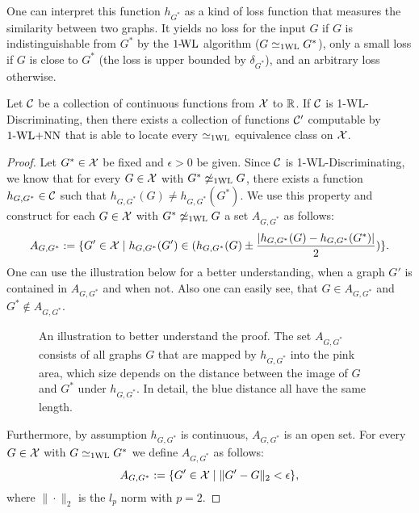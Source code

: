 One can interpret this function $h_{G^*}$ as a kind of loss function that measures the similarity between two graphs. It yields no loss for the input $G$ if $G$ is indistinguishable from $G^*$ by the $\text{1-\!WL}$ algorithm ($G \simeq_{\text{1WL}} G^*$), only a small loss if $G$ is close to $G^*$ (the loss is upper bounded by $\delta_{G^*}$), and an arbitrary loss otherwise.

\begin{lemma}\label{lem:continuous_proof1}
    Let $\mathcal{C}$ be a collection of continuous functions from $\mathcal{X}$ to $\mathbb{R}$. If $\mathcal{C}$ is 1-\!WL-Discriminating, then there exists a collection of functions $\mathcal{C}'$ computable by $\text{1-WL+NN}$ that is able to locate every $\simeq_{\text{1WL}}$ equivalence class on $\mathcal{X}$.
\end{lemma}

\begin{proof}
    Let $G^* \in \mathcal{X}$ be fixed and $\epsilon > 0$ be given. Since $\mathcal{C}$ is 1-\!WL-Discriminating, we know that for every $G \in \mathcal{X}$ with $G^* \not\simeq_{\text{1WL}} G$, there exists a function $h_{G, G^*} \in \mathcal{C}$ such that $h_{G, G^*}(G) \neq h_{G, G^*}(G^*)$. We use this property and construct for each $G \in \mathcal{X}$ with $G^* \not\simeq_{\text{1WL}} G$ a set $A_{G, G^*}$ as follows:
    \begin{equation*}
        A_{G, G^*} := \{ G' \in \mathcal{X} \mid h_{G, G^*}(G') \in (h_{G, G^*}(G) \pm \frac{|h_{G, G^*}(G) - h_{G, G^*}(G^*)|}{2})\}.
    \end{equation*}
    One can use the illustration below for a better understanding, when a graph $G'$ is contained in $A_{G, G^*}$ and when not. Also one can easily see, that $G \in A_{G, G^*}$ and $G^* \not\in A_{G, G^*}$.

    \begin{figure}[H]
        \centering
        
        \caption{An illustration to better understand the proof. The set $A_{G, G^*}$ consists of all graphs $G$ that are mapped by $h_{G, G^*}$ into the pink area, which size depends on the distance between the image of $G$ and $G^*$ under $h_{G, G^*}$. In detail, the blue distance all have the same length.}
        \label{fig:proof_continous1}
    \end{figure}

   Furthermore, by assumption $h_{G, G^*}$ is continuous, $A_{G, G^*}$ is an open set. For every $G \in \mathcal{X}$ with $G \simeq_{\text{1WL}} G^*$ we define $A_{G, G^*}$ as follows:
    \begin{equation*}
        A_{G, G^*} := \{ G' \in \mathcal{X} \mid \| G' - G \|_2 < \epsilon\},
    \end{equation*}
    where $\|\cdot\|_2$ is the $l_p$ norm with $p=2$.


\end{proof}
